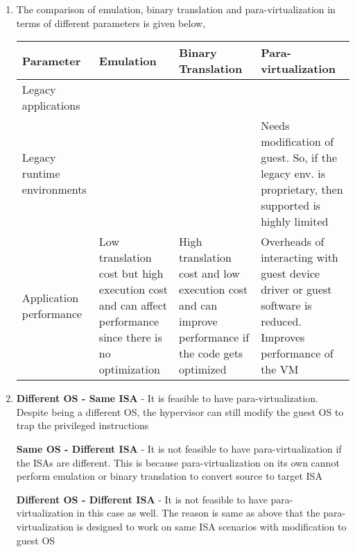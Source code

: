\documentclass[11pt,a4paper,oneside]{article}
\begin{document}
\begin{enumerate}
		\item The comparison of emulation, binary translation and para-virtualization in terms of different parameters is given below,
		
		\begin{center}
			\begin{tabular}{|p{2cm}|p{4cm}|p{4cm}|p{4cm}|}
				\hline 
				\textbf{Parameter}  & \textbf{Emulation} & \textbf{Binary Translation} & \textbf{Para-virtualization} \\
				\hline
				Legacy applications & & & \\
				\hline
				Legacy runtime environments & & & Needs modification of guest. So, if the legacy env. is proprietary, then supported is highly limited\\
				\hline
				Application performance & Low translation cost but high execution cost and can affect performance since there is no optimization & High translation cost and low execution cost and can improve performance if the code gets optimized & Overheads of interacting with guest device driver or guest software is reduced. Improves performance of the VM\\
				\hline
			\end{tabular}
		\end{center}
		
		\item \textbf{Different OS - Same ISA} - It is feasible to have para-virtualization. Despite being a different OS, the hypervisor can still modify the guest OS to trap the privileged instructions
		
		\textbf{Same OS - Different ISA} - It is not feasible to have para-virtualization if the ISAs are different. This is because para-virtualization on its own cannot perform emulation or binary translation to convert source to target ISA
		
		\textbf{Different OS - Different ISA} - It is not feasible to have para-virtualization in this case as well. The reason is same as above that the para-virtualization is designed to work on same ISA scenarios with modification to guest OS
		

\end{enumerate}
\end{document}
